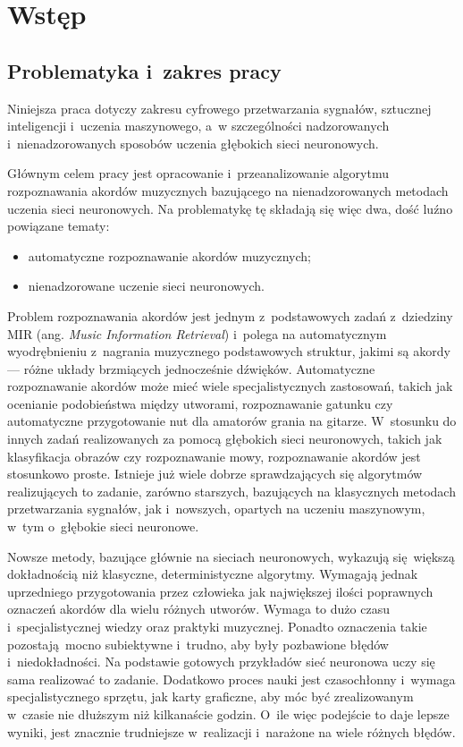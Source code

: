 \chapter{Wstęp} \label{chapter:introduction}



\section{Problematyka i~zakres pracy}

Niniejsza praca dotyczy zakresu cyfrowego przetwarzania sygnałów, sztucznej inteligencji i~uczenia maszynowego, a~w szczególności nadzorowanych i~nienadzorowanych sposobów uczenia głębokich sieci neuronowych.

Głównym celem pracy jest opracowanie i~przeanalizowanie algorytmu rozpoznawania akordów muzycznych bazującego na nienadzorowanych metodach uczenia sieci neuronowych. Na problematykę tę składają się więc dwa, dość luźno powiązane tematy:
\begin{itemize}
    \item automatyczne rozpoznawanie akordów muzycznych;
    \item nienadzorowane uczenie sieci neuronowych.
\end{itemize}

Problem rozpoznawania akordów jest jednym z~podstawowych zadań z~dziedziny MIR (ang. \emph{Music Information Retrieval}) i~polega na automatycznym wyodrębnieniu z~nagrania muzycznego podstawowych struktur, jakimi są akordy --- różne układy brzmiących jednocześnie dźwięków. Automatyczne rozpoznawanie akordów może mieć wiele specjalistycznych zastosowań, takich jak ocenianie podobieństwa między utworami, rozpoznawanie gatunku czy automatyczne przygotowanie nut dla amatorów grania na gitarze. W~stosunku do innych zadań realizowanych za pomocą głębokich sieci neuronowych, takich jak klasyfikacja obrazów czy rozpoznawanie mowy, rozpoznawanie akordów jest stosunkowo proste. Istnieje już wiele dobrze sprawdzających się algorytmów realizujących to zadanie, zarówno starszych, bazujących na klasycznych metodach przetwarzania sygnałów, jak i~nowszych, opartych na uczeniu maszynowym, w~tym o~głębokie sieci neuronowe. 

Nowsze metody, bazujące głównie na sieciach neuronowych, wykazują się większą dokładnością niż klasyczne, deterministyczne algorytmy. Wymagają jednak uprzedniego przygotowania przez człowieka jak największej ilości poprawnych oznaczeń akordów dla wielu różnych utworów. Wymaga to dużo czasu i~specjalistycznej wiedzy oraz praktyki muzycznej. Ponadto oznaczenia takie pozostają mocno subiektywne i~trudno, aby były pozbawione błędów i~niedokładności.  Na podstawie gotowych przykładów sieć neuronowa uczy się sama realizować to zadanie. Dodatkowo proces nauki jest czasochłonny i~wymaga specjalistycznego sprzętu, jak karty graficzne, aby móc być zrealizowanym w~czasie nie dłuższym niż kilkanaście godzin. O~ile więc podejście to daje lepsze wyniki, jest znacznie trudniejsze w~realizacji i~narażone na wiele różnych błędów.

